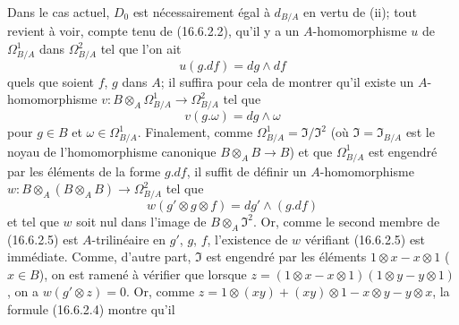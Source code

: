 Dans le cas actuel, $D_0$ est nécessairement égal à $d_{B/A}$ en vertu de
(ii); tout revient à voir, compte tenu de (16.6.2.2), qu'il y a un
$A$-homomorphisme $u$ de $\Omega_{B/A}^1$ dans $\Omega_{B/A}^2$ tel que
l'on ait
\[
  u(g.df)=dg\wedge df
  \tag{16.6.2.3}
  \label{IV.16.6.2.3}
\]
quels que soient $f$, $g$ dans $A$; il suffira pour cela de montrer qu'il
existe un $A$-homomorphisme
$v:B\otimes_A\Omega_{B/A}^1\to\Omega_{B/A}^2$ tel que
\[
  v(g.\omega)=dg\wedge\omega
  \tag{16.6.2.4}
  \label{IV.16.6.2.4}
\]
pour $g\in B$ et $\omega\in\Omega_{B/A}^1$. Finalement, comme
$\Omega_{B/A}^1=\mathfrak{I}/\mathfrak{I}^2$ (où
$\mathfrak{I}=\mathfrak{I}_{B/A}$ est le noyau de l'homomorphisme canonique
$B\otimes_A B\to B$) et que $\Omega_{B/A}^1$ est engendré par les éléments
de la forme $g.df$, il suffit de définir un $A$-homomorphisme
$w:B\otimes_A(B\otimes_A B)\to\Omega_{B/A}^2$ tel que
\[
  w(g'\otimes g\otimes f)=dg'\wedge(g.df)
  \tag{16.6.2.5}
  \label{IV.16.6.2.5}
\]
et tel que $w$ soit nul dans l'image de $B\otimes_A\mathfrak{I}^2$. Or,
comme le second membre de (16.6.2.5) est $A$-trilinéaire en $g'$, $g$, $f$,
l'existence de $w$ vérifiant (16.6.2.5) est immédiate. Comme, d'autre part,
$\mathfrak{I}$ est engendré par les éléments $1\otimes x-x\otimes1$
($x\in B$), on est ramené à vérifier que lorsque
$z=(1\otimes x-x\otimes1)(1\otimes y-y\otimes1)$, on a
$w(g'\otimes z)=0$. Or, comme
$z=1\otimes(xy)+(xy)\otimes1-x\otimes y-y\otimes x$, la formule (16.6.2.4)
montre qu'il
